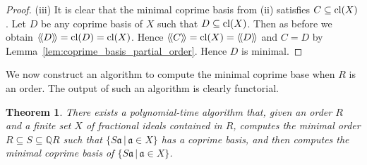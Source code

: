\documentclass{amsart}
\theoremstyle{plain}
\newtheorem{theorem}{Theorem}[section]
\theoremstyle{definition}
\newcommand{\lla}{\langle\!\langle}
\newcommand{\rra}{\rangle\!\rangle}
\newcommand{\Q}{\ensuremath{\mathbb{Q}}}
\begin{document}
\begin{proof}
(iii) It is clear that the minimal coprime basis from (ii) satisfies \(C\subseteq\textup{cl}(X)\).
Let \(D\) be any coprime basis of \(X\) such that \(D\subseteq\textup{cl}(X)\).
Then as before we obtain \(\lla D\rra = \textup{cl}(D)=\textup{cl}(X)\).
Hence \(\lla C \rra = \textup{cl}(X)=\lla D\rra\) and \(C=D\) by Lemma~\ref{lem:coprime_basis_partial_order}. Hence \(D\) is minimal.
\end{proof}

We now construct an algorithm to compute the minimal coprime base when \(R\) is an order. 
The output of such an algorithm is clearly functorial. %

\begin{theorem}\label{thm:coprime_basis}
There exists a polynomial-time algorithm that, given an order \(R\) and a finite set \(X\) of fractional ideals contained in \(R\), computes the minimal order \(R\subseteq S\subseteq \Q R\) such that \(\{S\mathfrak{a} \,|\, \mathfrak{a}\in X \}\) has a coprime basis, and then computes the minimal coprime basis of \(\{S\mathfrak{a} \,|\, \mathfrak{a}\in X \}\).
\end{theorem}
\end{document}
